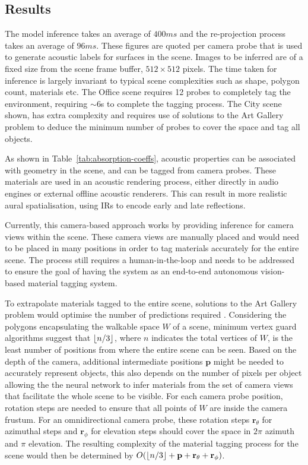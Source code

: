 \subsection{Results}
The model inference takes an average of $400 ms$ and the re-projection process takes an average of $96ms$. These figures are quoted per camera probe that is used to generate acoustic labels for surfaces in the scene. Images to be inferred are of a fixed size from the scene frame buffer, $512 \times 512$ pixels. The time taken for inference is largely invariant to typical scene complexities such as shape, polygon count, materials etc. The Office scene requires 12 probes to completely tag the environment, requiring $\sim$6s to complete the tagging process. The City scene shown, has extra complexity and requires use of solutions to the Art Gallery problem to deduce the minimum number of probes to cover the space and tag all objects.\par
As shown in Table~\ref{tab:absorption-coeffs}, acoustic properties can be associated with geometry in the scene, and can be tagged from camera probes. These materials are used in an acoustic rendering process, either directly in audio engines or external offline acoustic renderers. This can result in more realistic aural spatialisation, using IRs to encode early and late reflections.\par
Currently, this camera-based approach works by providing inference for camera views within the scene. These camera views are manually placed and would need to be placed in many positions in order to tag materials accurately for the entire scene. The process still requires a human-in-the-loop and needs to be addressed to ensure the goal of having the system as an end-to-end autonomous vision-based material tagging system.\par
To extrapolate materials tagged to the entire scene, solutions to the Art Gallery problem would optimise the number of predictions required \cite{devadoss2011discrete, bajuelos2008optimizing}. Considering the polygons encapsulating the walkable space $W$ of a scene, minimum vertex guard algorithms suggest that $\floor*{n/3}$, where $n$ indicates the total vertices of $W$, is the least number of positions from where the entire scene can be seen. Based on the depth of the camera, additional intermediate positions $\textbf{p}$ might be needed to accurately represent objects, this also depends on the number of pixels per object allowing the the neural network to infer materials from the set of camera views that facilitate the whole scene to be visible. For each camera probe position, rotation steps are needed to ensure that all points of $W$ are inside the camera frustum. For an omnidirectional camera probe, these rotation steps $\textbf{r}_\theta$ for azimuthal steps and $\textbf{r}_\phi$ for elevation steps should cover the space in $2\pi$ azimuth and $\pi$ elevation. The resulting complexity of the material tagging process for the scene would then be determined by $O(\floor*{n/3} + \textbf{p} + \textbf{r}_\theta + \textbf{r}_\phi)$.


